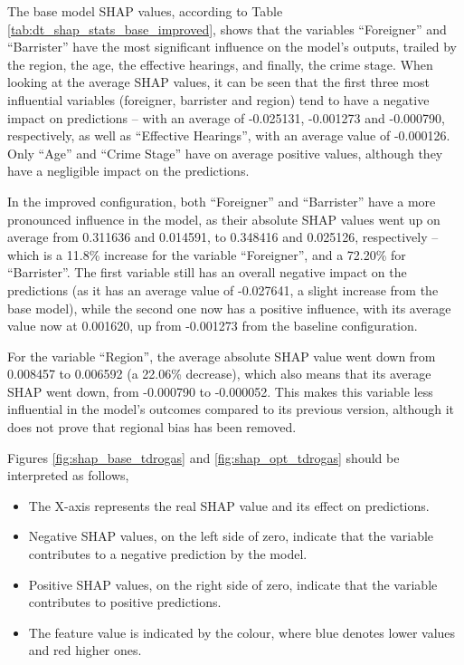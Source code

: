 \documentclass[fleqn,10pt]{wlscirep}
\begin{document}
The base model SHAP values, according to Table \ref{tab:dt_shap_stats_base_improved}, shows that the variables ``Foreigner'' and ``Barrister'' have the most significant influence on the model's outputs, trailed by the region, the age, the effective hearings, and finally, the crime stage. When looking at the average SHAP values, it can be seen that the first three most influential variables (foreigner, barrister and region) tend to have a negative impact on predictions -- with an average of -0.025131, -0.001273 and -0.000790, respectively, as well as ``Effective Hearings'', with an average value of -0.000126. Only ``Age'' and ``Crime Stage'' have on average positive values, although they have a negligible impact on the predictions.

In the improved configuration, both ``Foreigner'' and ``Barrister'' have a more pronounced influence in the model, as their absolute SHAP values went up on average from 0.311636 and 0.014591, to 0.348416 and 0.025126, respectively -- which is a 11.8\% increase for the variable ``Foreigner'', and a 72.20\% for ``Barrister''. The first variable still has an overall negative impact on the predictions (as it has an average value of -0.027641, a slight increase from the base model), while the second one now has a positive influence, with its average value now at 0.001620, up from -0.001273 from the baseline configuration.

For the variable ``Region'', the average absolute SHAP value went down from 0.008457 to 0.006592 (a 22.06\% decrease), which also means that its average SHAP went down, from -0.000790 to -0.000052. This makes this variable less influential in the model's outcomes compared to its previous version, although it does not prove that regional bias has been removed.

 Figures \ref{fig:shap_base_tdrogas} and \ref{fig:shap_opt_tdrogas} should be interpreted as follows,
 \begin{itemize}
     \item The X-axis represents the real SHAP value and its effect on predictions.
     \item Negative SHAP values, on the left side of zero, indicate that the variable contributes to a negative prediction by the model.
     \item Positive SHAP values, on the right side of zero, indicate that the variable contributes to positive predictions.
     \item The feature value is indicated by the colour, where blue denotes lower values and red higher ones.
 \end{itemize}
\end{document}
